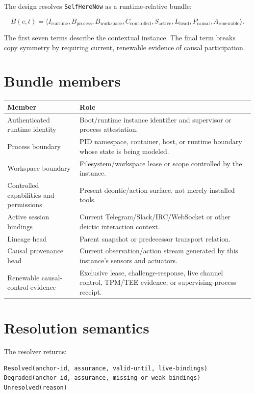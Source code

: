 \documentclass[11pt,oneside]{report}
\newcommand{\SelfHereNow}{\texttt{SelfHereNow}}
\begin{document}
The design resolves \SelfHereNow{} as a runtime-relative bundle:

\[
B(c,t)=\langle
I_{\mathrm{runtime}},
B_{\mathrm{process}},
B_{\mathrm{workspace}},
C_{\mathrm{controlled}},
S_{\mathrm{active}},
L_{\mathrm{head}},
P_{\mathrm{causal}},
A_{\mathrm{renewable}}
\rangle.
\]

The first seven terms describe the contextual instance. The final term breaks copy symmetry by requiring current, renewable evidence of causal participation.

\section{Bundle members}

\begin{longtable}{@{}L{1.60in}L{4.95in}@{}}
\toprule
\textbf{Member} & \textbf{Role} \\
\midrule
Authenticated runtime identity & Boot/runtime instance identifier and supervisor or process attestation. \\
Process boundary & PID namespace, container, host, or runtime boundary whose state is being modeled. \\
Workspace boundary & Filesystem/workspace lease or scope controlled by the instance. \\
Controlled capabilities and permissions & Present deontic/action surface, not merely installed tools. \\
Active session bindings & Current Telegram/Slack/IRC/WebSocket or other deictic interaction context. \\
Lineage head & Parent snapshot or predecessor transport relation. \\
Causal provenance head & Current observation/action stream generated by this instance's sensors and actuators. \\
Renewable causal-control evidence & Exclusive lease, challenge-response, live channel control, TPM/TEE evidence, or supervising-process receipt. \\
\bottomrule
\end{longtable}

\section{Resolution semantics}

The resolver returns:

\begin{lstlisting}[caption={SelfHereNow resolution result}]
Resolved(anchor-id, assurance, valid-until, live-bindings)
Degraded(anchor-id, assurance, missing-or-weak-bindings)
Unresolved(reason)
\end{lstlisting}
\end{document}
